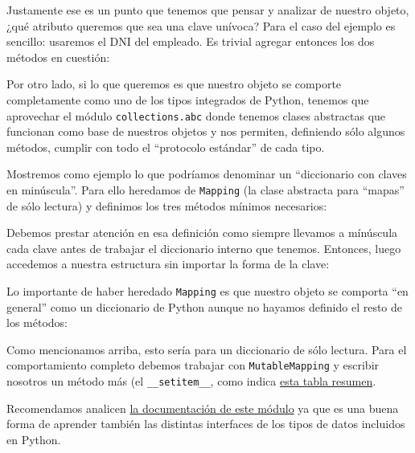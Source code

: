 Justamente ese es un punto que tenemos que pensar y analizar de nuestro objeto, ¿qué atributo queremos que sea una clave unívoca? Para el caso del ejemplo es sencillo: usaremos el DNI del empleado. Es trivial agregar entonces los dos métodos en cuestión:


Por otro lado, si lo que queremos es que nuestro objeto se comporte completamente como uno de los tipos integrados de Python, tenemos que aprovechar el módulo \texttt{collections.abc} donde tenemos clases abstractas que funcionan como base de nuestros objetos y nos permiten, definiendo sólo algunos métodos, cumplir con todo el ``protocolo estándar'' de cada tipo.

Mostremos como ejemplo lo que podríamos denominar un ``diccionario con claves en minúscula''. Para ello heredamos de \texttt{Mapping} (la clase abstracta para ``mapas'' de sólo lectura) y definimos los tres métodos mínimos necesarios:


Debemos prestar atención en esa definición como siempre llevamos a mínúscula cada clave antes de trabajar el diccionario interno que tenemos. Entonces, luego accedemos a nuestra estructura sin importar la forma de la clave:


Lo importante de haber heredado \texttt{Mapping} es que nuestro objeto se comporta ``en general'' como un diccionario de Python aunque no hayamos definido el resto de los métodos:


Como mencionamos arriba, esto sería para un diccionario de sólo lectura. Para el comportamiento completo debemos trabajar con \texttt{MutableMapping} y escribir nosotros un método más (el \texttt{\_\_setitem\_\_}, como indica \href{https://docs.python.org/es/dev/library/collections.abc.html#collections-abstract-base-classes}{esta tabla resumen}.

Recomendamos analicen \href{https://docs.python.org/es/dev/library/collections.abc.html}{la documentación de este módulo} ya que es una buena forma de aprender también las distintas interfaces de los tipos de datos incluidos en Python.
